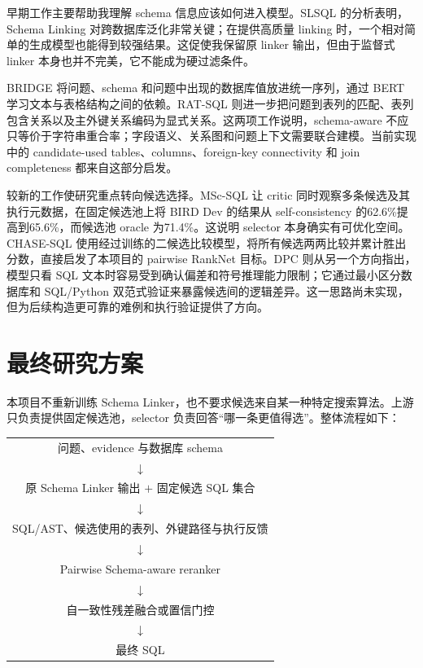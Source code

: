 \documentclass[UTF8,11pt,fontset=windows]{ctexart}
\begin{document}
早期工作主要帮助我理解 schema 信息应该如何进入模型。SLSQL 的分析表明，Schema Linking 对跨数据库泛化非常关键；在提供高质量 linking 时，一个相对简单的生成模型也能得到较强结果\cite{lei2020slsql}。这促使我保留原 linker 输出，但由于监督式 linker 本身也并不完美，它不能成为硬过滤条件。

BRIDGE 将问题、schema 和问题中出现的数据库值放进统一序列，通过 BERT 学习文本与表格结构之间的依赖\cite{lin2020bridge}。RAT-SQL 则进一步把问题到表列的匹配、表列包含关系以及主外键关系编码为显式关系\cite{wang2020ratsql}。这两项工作说明，schema-aware 不应只等价于字符串重合率；字段语义、关系图和问题上下文需要联合建模。当前实现中的 candidate-used tables、columns、foreign-key connectivity 和 join completeness 都来自这部分启发。

较新的工作使研究重点转向候选选择。MSc-SQL 让 critic 同时观察多条候选及其执行元数据，在固定候选池上将 BIRD Dev 的结果从 self-consistency 的62.6\%提高到65.6\%，而候选池 oracle 为71.4\%\cite{gorti2025mscsql}。这说明 selector 本身确实有可优化空间。CHASE-SQL 使用经过训练的二候选比较模型，将所有候选两两比较并累计胜出分数\cite{pourreza2024chasesql}，直接启发了本项目的 pairwise RankNet 目标。DPC 则从另一个方向指出，模型只看 SQL 文本时容易受到确认偏差和符号推理能力限制；它通过最小区分数据库和 SQL/Python 双范式验证来暴露候选间的逻辑差异\cite{li2026dpc}。这一思路尚未实现，但为后续构造更可靠的难例和执行验证提供了方向。

\section{最终研究方案}

本项目不重新训练 Schema Linker，也不要求候选来自某一种特定搜索算法。上游只负责提供固定候选池，selector 负责回答“哪一条更值得选”。整体流程如下：

\begin{center}
\small
\begin{tabular}{c}
问题、evidence 与数据库 schema\\
$\downarrow$\\
原 Schema Linker 输出 $+$ 固定候选 SQL 集合\\
$\downarrow$\\
SQL/AST、候选使用的表列、外键路径与执行反馈\\
$\downarrow$\\
Pairwise Schema-aware reranker\\
$\downarrow$\\
自一致性残差融合或置信门控\\
$\downarrow$\\
最终 SQL
\end{tabular}
\end{center}
\end{document}
